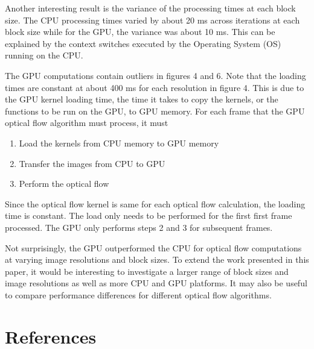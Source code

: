 \documentclass[12pt,letterpaper]{article}
\begin{document}
Another interesting result is the variance of the processing times at each 
block size. The CPU processing times varied by about 20 ms across iterations at
each block size while for the GPU, the variance was about 10 ms. This can be
explained by the context switches executed by the Operating System (OS) running
on the CPU. 

The GPU computations contain outliers in figures 4 and 6. Note that the loading
times are constant at about 400 ms for each resolution in figure 4. This is due
to the GPU kernel loading time, the time it takes to copy the kernels, or the
functions to be run on the GPU, to GPU memory. For each frame that the GPU 
optical flow algorithm must process, it must 
\begin{enumerate}
    \item Load the kernels from CPU memory to GPU memory
    \item Transfer the images from CPU to GPU
    \item Perform the optical flow
\end{enumerate}
Since the optical flow kernel is same for each optical flow calculation, the
loading time is constant. The load only needs to be performed for the first 
first frame processed. The GPU only performs steps 2 and 3 for subsequent 
frames.

Not surprisingly, the GPU outperformed the CPU for optical flow computations at
varying image resolutions and block sizes. To extend the work presented in this
paper, it would be interesting to investigate a larger range of block sizes and
image resolutions as well as more CPU and GPU platforms. It may also be useful
to compare performance differences for different optical flow algorithms. 
\section{References}
\nocite{*}


\end{document}
